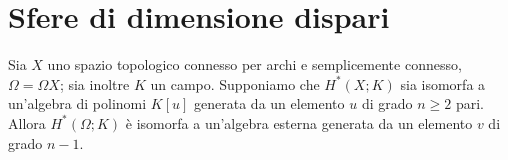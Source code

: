 \section{Sfere di dimensione dispari}
\begin{lemma}
Sia $X$ uno spazio topologico connesso per archi e semplicemente connesso, $\Omega=\Omega X$; sia inoltre $K$ un campo. Supponiamo che $H^*(X;K)$ sia isomorfa a un'algebra di polinomi $K[u]$ generata da un elemento $u$ di grado $n\ge 2$ pari. Allora $H^*(\Omega;K)$ è isomorfa a un'algebra esterna generata da un elemento $v$ di grado $n-1$.
\end{lemma}